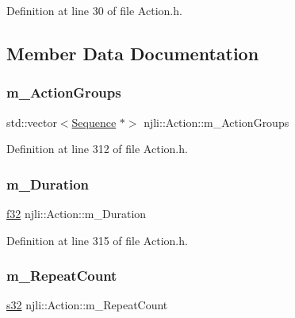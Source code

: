 Definition at line 30 of file Action.\+h.



\subsection{Member Data Documentation}
\mbox{\label{classnjli_1_1_action_a12cae1b645280c6811d664183c63600b}} 
\subsubsection{\texorpdfstring{m\+\_\+\+Action\+Groups}{m\_ActionGroups}}
{\footnotesize\ttfamily std\+::vector$<$\mbox{\hyperlink{structnjli_1_1_action_1_1_sequence}{Sequence}} $\ast$$>$ njli\+::\+Action\+::m\+\_\+\+Action\+Groups\hspace{0.3cm}{\ttfamily [private]}}



Definition at line 312 of file Action.\+h.

\mbox{\label{classnjli_1_1_action_a0e9ef8b9fb180016c4f4abec67ad8dac}} 
\subsubsection{\texorpdfstring{m\+\_\+\+Duration}{m\_Duration}}
{\footnotesize\ttfamily \mbox{\hyperlink{_util_8h_a5f6906312a689f27d70e9d086649d3fd}{f32}} njli\+::\+Action\+::m\+\_\+\+Duration\hspace{0.3cm}{\ttfamily [private]}}



Definition at line 315 of file Action.\+h.

\mbox{\label{classnjli_1_1_action_a7407ab22c618d86062eb6455c8f071cf}} 
\subsubsection{\texorpdfstring{m\+\_\+\+Repeat\+Count}{m\_RepeatCount}}
{\footnotesize\ttfamily \mbox{\hyperlink{_util_8h_aa62c75d314a0d1f37f79c4b73b2292e2}{s32}} njli\+::\+Action\+::m\+\_\+\+Repeat\+Count\hspace{0.3cm}{\ttfamily [private]}}



